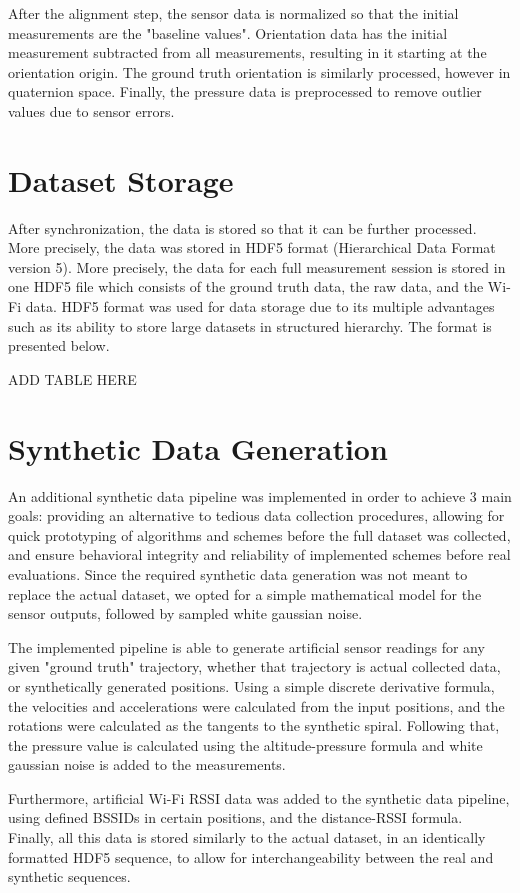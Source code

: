 After the alignment step, the sensor data is normalized so that the initial measurements are the "baseline values". Orientation data has the initial measurement subtracted from all measurements, resulting in it starting at the orientation origin. The ground truth orientation is similarly processed, however in quaternion space. Finally, the pressure data is preprocessed to remove outlier values due to sensor errors.

\section{Dataset Storage}
After synchronization, the data is stored so that it can be further processed. More precisely, the data was stored in HDF5 format (Hierarchical Data Format version 5). More precisely, the data for each full measurement session is stored in one HDF5 file which consists of the ground truth data, the raw data, and the Wi-Fi data. HDF5 format was used for data storage due to its multiple advantages such as its ability to store large datasets in structured hierarchy. The format is presented below.  \cite{hierarchical}
\par
ADD TABLE HERE

\section{Synthetic Data Generation}
An additional synthetic data pipeline was implemented in order to achieve 3 main goals: providing an alternative to tedious data collection procedures, allowing for quick prototyping of algorithms and schemes before the full dataset was collected, and ensure behavioral integrity and reliability of implemented schemes before real evaluations. Since the required synthetic data generation was not meant to replace the actual dataset, we opted for a simple mathematical model for the sensor outputs, followed by sampled white gaussian noise.
\par
The implemented pipeline is able to generate artificial sensor readings for any given "ground truth" trajectory, whether that trajectory is actual collected data, or synthetically generated positions. Using a simple discrete derivative formula, the velocities and accelerations were calculated from the input positions, and the rotations were calculated as the tangents to the synthetic spiral. Following that, the pressure value is calculated using the altitude-pressure formula \cite{barometric} and white gaussian noise is added to the measurements.
\par
Furthermore, artificial Wi-Fi RSSI data was added to the synthetic data pipeline, using defined BSSIDs in certain positions, and the distance-RSSI formula. \cite{shang_2014_a} Finally, all this data is stored similarly to the actual dataset, in an identically formatted HDF5 sequence, to allow for interchangeability between the real and synthetic sequences.



